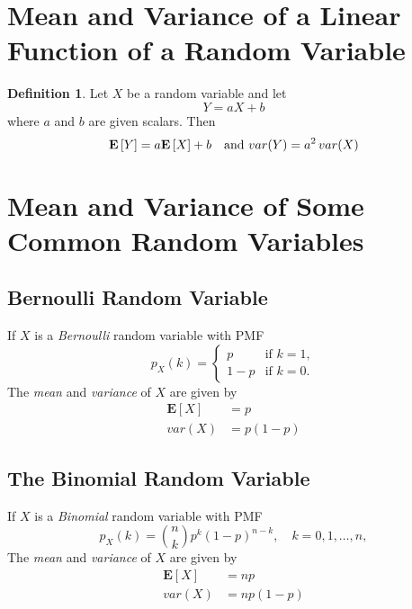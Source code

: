 \documentclass{tufte-handout}
\theoremstyle{definition} \newtheorem{definition}{Definition}
\theoremstyle{definition} \newtheorem{remark}{Remark}
\theoremstyle{definition} \newtheorem{example}{Example}
\newcommand{\pmf}[2]{p_#1 \left( #2 \right)}
\newcommand{\expt}[1]{\mathbf{E} \left[ #1 \right]}
\begin{document}
\section{Mean and Variance of a Linear Function of a Random Variable}
\begin{definition}
  Let $X$ be a random variable and let
  \begin{equation*}
    Y = aX + b
  \end{equation*}
  where $a$ and $b$ are given scalars. Then
  \begin{equation*}
    \expt{Y} = a \expt{X} + b \quad \textnormal{and }var(Y) = a^2\, var(X)
  \end{equation*}
\end{definition}

\section{Mean and Variance of Some Common Random Variables}

\subsection{Bernoulli Random Variable}
If $X$ is a \emph{Bernoulli} random variable with PMF
\begin{equation*}
  \pmf{X}{k} =
  \begin{cases}
    p & \text{if } k = 1,\\
    1 - p & \text{if } k = 0.
  \end{cases}
\end{equation*}
The \emph{mean} and \emph{variance} of $X$ are given by
\begin{align*}
  \expt{X} & = p\\
  var(X)   & = p(1-p)
\end{align*}

\subsection{The Binomial Random Variable}
If $X$ is a \emph{Binomial} random variable with PMF
\begin{equation*}
  \pmf{X}{k} = \binom{n}{k} p^k {(1 - p)}^{n - k}, \quad k = 0, 1,
  \ldots, n,
\end{equation*}
The \emph{mean} and \emph{variance} of $X$ are given by
\begin{align*}
  \expt{X} & = np\\
  var(X)   & = np(1-p)
\end{align*}
\end{document}
